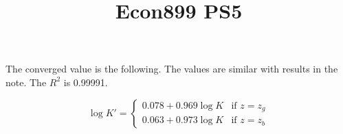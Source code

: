 \documentclass{article}
\title{Econ899 PS5}
\begin{document}
\maketitle

The converged value is the following. The values are similar with results in the note. The $R^2$ is 0.99991. 

$$
   \log K' =\begin{cases}
		 0.078 + 0.969 \log K  & \text{if } z = z_g\\
                 0.063 + 0.973 \log K  & \text{if } z = z_b
               \end{cases}
$$
\end{document}
